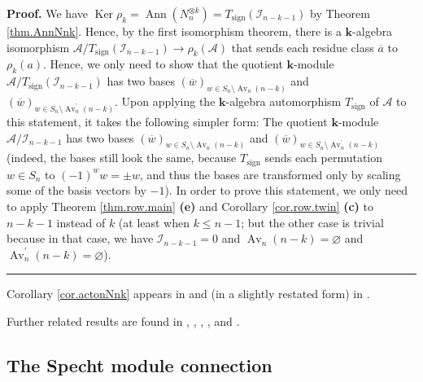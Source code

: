 \documentclass[numbers=enddot,12pt,final,onecolumn,notitlepage]{scrartcl}%
\numberwithin{exer}{subsection}
\theoremstyle{definition}
\newenvironment{proof}[1][Proof]{\noindent\textbf{#1.} }{\ \rule{0.5em}{0.5em}}
\begin{document}
\begin{proof}
We have $\operatorname*{Ker}\rho_{k}=\operatorname*{Ann}\left(  N_{n}^{\otimes
k}\right)  =T_{\operatorname*{sign}}\left(  \mathcal{I}_{n-k-1}\right)  $ by
Theorem \ref{thm.AnnNnk}. Hence, by the first isomorphism theorem, there is a
$\mathbf{k}$-algebra isomorphism $\mathcal{A}/T_{\operatorname*{sign}}\left(
\mathcal{I}_{n-k-1}\right)  \rightarrow\rho_{k}\left(  \mathcal{A}\right)  $
that sends each residue class $\overline{a}$ to $\rho_{k}\left(  a\right)  $.
Hence, we only need to show that the quotient $\mathbf{k}$-module
$\mathcal{A}/T_{\operatorname*{sign}}\left(  \mathcal{I}_{n-k-1}\right)  $ has
two bases $\left(  \overline{w}\right)  _{w\in S_{n}\setminus
\operatorname*{Av}\nolimits_{n}\left(  n-k\right)  }$ and $\left(
\overline{w}\right)  _{w\in S_{n}\setminus\operatorname*{Av}\nolimits_{n}%
^{\prime}\left(  n-k\right)  }$. Upon applying the $\mathbf{k}$-algebra
automorphism $T_{\operatorname*{sign}}$ of $\mathcal{A}$ to this statement, it
takes the following simpler form: The quotient $\mathbf{k}$-module
$\mathcal{A}/\mathcal{I}_{n-k-1}$ has two bases $\left(  \overline{w}\right)
_{w\in S_{n}\setminus\operatorname*{Av}\nolimits_{n}\left(  n-k\right)  }$ and
$\left(  \overline{w}\right)  _{w\in S_{n}\setminus\operatorname*{Av}%
\nolimits_{n}^{\prime}\left(  n-k\right)  }$ (indeed, the bases still look the
same, because $T_{\operatorname*{sign}}$ sends each permutation $w\in S_{n}$
to $\left(  -1\right)  ^{w}w=\pm w$, and thus the bases are transformed only
by scaling some of the basis vectors by $-1$). In order to prove this
statement, we only need to apply Theorem \ref{thm.row.main} \textbf{(e)} and
Corollary \ref{cor.row.twin} \textbf{(c)} to $n-k-1$ instead of $k$ (at least
when $k\leq n-1$; but the other case is trivial because in that case, we have
$\mathcal{I}_{n-k-1}=0$ and $\operatorname*{Av}\nolimits_{n}\left(
n-k\right)  =\varnothing$ and $\operatorname*{Av}\nolimits_{n}^{\prime}\left(
n-k\right)  =\varnothing$).
\end{proof}

Corollary \ref{cor.actonNnk} appears in \cite[Example 2.13]{Donkin24} and (in
a slightly restated form) in \cite[Corollary 1.4 (ii)]{BoDoMa22}.

Further related results are found in \cite{DotNym07}, \cite{BoDoMa18},
\cite{BoDoMa22}, \cite{RaSaSu12}, \cite{Donkin24} and \cite[\S 8]{BaiRai}.

\subsection{The Specht module connection}
\end{document}
